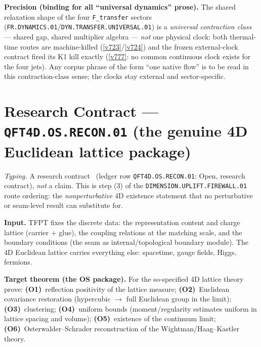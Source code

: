 \documentclass[11pt,a4paper]{article}
\begin{document}
\par\smallskip\noindent\textbf{Precision (binding for all ``universal dynamics'' prose).}  The
shared relaxation shape of the four \texttt{F\_transfer} sectors
(\texttt{FR.DYNAMICS.01}/\texttt{DYN.TRANSFER.UNIVERSAL.01}) is a \emph{universal contraction
class} --- shared gap, shared multiplier algebra --- \emph{not} one physical clock: both
thermal-time routes are machine-killed (\vref{v723}/\vref{v724}) and the frozen external-clock
contract fired its K1 kill exactly (\vref{v777}: no common continuous clock exists for the four
jets).  Any corpus phrase of the form ``one native flow'' is to be read in this contraction-class
sense; the clocks stay external and sector-specific.

\section*{Research Contract --- \texttt{QFT4D.OS.RECON.01} (the genuine 4D Euclidean lattice package)}
\noindent\emph{Typing.} A research contract \mO\ (ledger row \texttt{QFT4D.OS.RECON.01}: Open,
research contract), \emph{not} a claim.  This is step (3) of the
\texttt{DIMENSION.UPLIFT.FIREWALL.01} route ordering: the \emph{nonperturbative} 4D existence
statement that no perturbative or seam-level result can substitute for.

\par\smallskip\noindent\textbf{Input.}  TFPT fixes the discrete data: the representation content
and charge lattice (carrier $+$ glue), the coupling relations at the matching scale, and the
boundary conditions (the seam as internal/topological boundary module).  The 4D Euclidean
lattice carries everything else: spacetime, gauge fields, Higgs, fermions.

\par\smallskip\noindent\textbf{Target theorem (the OS package).}  For the so-specified 4D
lattice theory prove: \textbf{(O1)}~reflection positivity of the lattice measure;
\textbf{(O2)}~Euclidean covariance restoration (hypercubic $\to$ full Euclidean group in the
limit); \textbf{(O3)}~clustering; \textbf{(O4)}~uniform bounds (moment/regularity estimates
uniform in lattice spacing and volume); \textbf{(O5)}~existence of the continuum limit;
\textbf{(O6)}~Osterwalder--Schrader reconstruction of the Wightman/Haag--Kastler theory.
\end{document}
